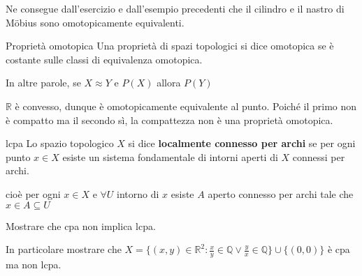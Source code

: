 \begin{remark}
    Ne consegue dall'esercizio e dall'esempio precedenti che il cilindro e il
    nastro di Möbius sono omotopicamente equivalenti.
\end{remark}

\begin{definition}{Proprietà omotopica}
    Una proprietà di spazi topologici si dice omotopica se è costante sulle
    classi di equivalenza omotopica.

    In altre parole, se \(X \approx Y\) e \(P(X)\) allora \(P(Y)\) 
\end{definition}

\(\mathbb{R}\) è convesso, dunque è omotopicamente equivalente al punto. Poiché
il primo non è compatto ma il secondo sì, la compattezza non è una proprietà
omotopica.

\begin{definition}{lcpa}
    Lo spazio topologico \(X\) si dice \textbf{localmente connesso per archi} se
    per ogni punto \(x \in X\) esiste un sistema fondamentale di intorni aperti
    di \(X\) connessi per archi.
\end{definition}
\begin{note}
    cioè per ogni \(x \in X\) e \(\forall U\) intorno di \(x\) esiste \(A\)
    aperto connesso per archi tale che \(x \in A \subseteq U \) 
\end{note}

\begin{eser}
    Mostrare che cpa non implica lcpa.

    In particolare mostrare che \(X = \{{(x,y)} \in \mathbb{R}^2 : \frac{x}{y} \in
    \mathbb{Q} \lor \frac{y}{x} \in \mathbb{Q}\} \cup \{{(0,0)}\} \) è cpa ma
    non lcpa.
\end{eser}

